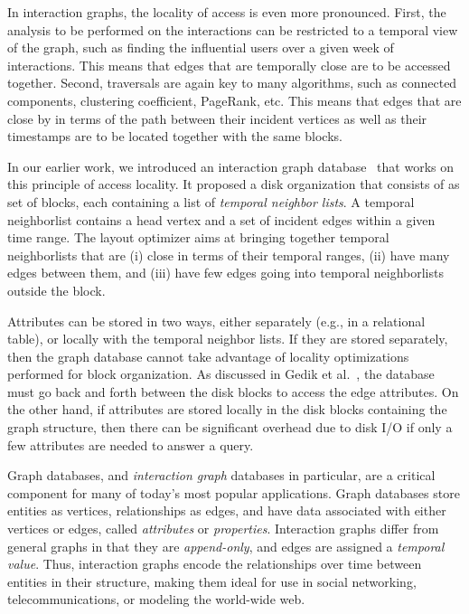 In interaction graphs, the locality of access is even more pronounced. First, 
the analysis to be performed on the interactions can be restricted to a
temporal view of the graph, such as finding the influential users over a given
week of interactions. This means that edges that are temporally close are to
be accessed together. Second, traversals are again key to many algorithms,
such as connected components, clustering coefficient, PageRank, etc. This
means that edges that are close by in terms of the path between their incident
vertices as well as their timestamps are to be located together with the same
blocks. 

In our earlier work, we introduced an interaction graph database~\cite{gedik14}
that works on this principle of access locality. It proposed a disk
organization that consists of as set of blocks, each containing a list of
\emph{temporal neighbor lists}. A temporal neighborlist contains a head vertex
and a set of incident edges within a given time range. The layout optimizer
aims at bringing together temporal neighborlists that are (i) close in terms
of their temporal ranges, (ii) have many edges between them, and (iii) have
few edges going into temporal neighborlists outside the block.


Attributes can be stored in two ways, either separately
(e.g., in a relational table), or locally with the temporal neighbor lists. 
If they are stored separately, then the graph database cannot take advantage
of locality optimizations performed for block organization.  As discussed in
Gedik et al.~\cite{gedik14}, the database must go back and forth between the
disk blocks to access the edge attributes.  On the other hand, if attributes
are stored locally in the disk blocks containing the graph structure, then
there can be significant overhead due to disk I/O if only a few attributes are
needed to answer a query.




Graph databases, and \emph{interaction graph} databases in particular, are a
critical component for many of today's most popular applications.  Graph
databases store entities as vertices, relationships as edges, and have data
associated with either vertices or edges, called \emph{attributes} or
\emph{properties}.  Interaction graphs differ from general graphs in that they
are \emph{append-only}, and edges are assigned a \emph{temporal value}.  Thus,
interaction graphs encode the relationships over time between entities in
their structure, making them ideal for use in social networking,
telecommunications, or modeling the world-wide web.

